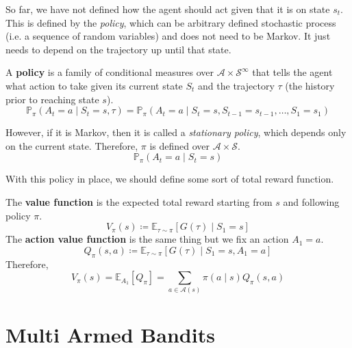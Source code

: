 \documentclass{article}
\begin{document}
  So far, we have not defined how the agent should act given that it is on state $s_t$. This is defined by the \textit{policy}, which can be arbitrary defined stochastic process (i.e. a sequence of random variables) and does not need to be Markov. It just needs to depend on the trajectory up until that state. 

  \begin{definition}[Policy]
    A \textbf{policy} is a family of conditional measures over $\mathcal{A} \times \mathcal{S}^\infty$ that tells the agent what action to take given its current state $S_t$ and the trajectory $\tau$ (the history prior to reaching state $s$).  
    \begin{equation}
      \mathbb{P}_\pi (A_t = a \mid S_t = s, \tau) = \mathbb{P}_{\pi} (A_t = a \mid S_t = s, S_{t-1} = s_{t-1}, \ldots, S_1 = s_1)
    \end{equation}
  \end{definition}

  \begin{definition}
    However, if it is Markov, then it is called a \textit{stationary policy}, which depends only on the current state. Therefore, $\pi$ is defined over $\mathcal{A} \times \mathcal{S}$. 
    \begin{equation}
      \mathbb{P}_\pi (A_t = a \mid S_t = s)
    \end{equation}
  \end{definition}

  With this policy in place, we should define some sort of total reward function. 

  \begin{definition}
    The \textbf{value function} is the expected total reward starting from $s$ and following policy $\pi$. 
    \begin{equation}
      V_\pi (s) \coloneqq \mathbb{E}_{\tau \sim \pi} [G(\tau) \mid S_1 = s]
    \end{equation}
    The \textbf{action value function} is the same thing but we fix an action $A_1 = a$. 
    \begin{equation}
      Q_{\pi} (s, a) \coloneqq \mathbb{E}_{\tau \sim \pi} [G(\tau) \mid S_1 = s, A_1 = a]
    \end{equation}
    Therefore, 
    \begin{equation}
      V_\pi (s) = \mathbb{E}_{A_1} [Q_\pi] = \sum_{a \in \mathcal{A}(s)} \pi(a \mid s) Q_\pi (s, a)
    \end{equation}
  \end{definition}

  

\section{Multi Armed Bandits}




\end{document}
